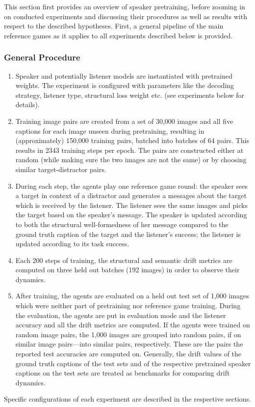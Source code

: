 This section first provides an overview of speaker pretraining, before zooming in on conducted experiments and discussing their procedures as well as results with respect to the described hypotheses.
First, a general pipeline of the main reference games as it applies to all experiments described below is provided.

\subsubsection{General Procedure}
\begin{enumerate}
	\item Speaker and potentially listener models are instantiated with pretrained weights. The experiment is configured with parameters like the decoding strategy, listener type, structural loss weight etc. (see experiments below for details).   
	\item Training image pairs are created from a set of 30,000 images and all five captions for each image unseen during pretraining, resulting in (approximately) 150,000 training pairs, batched into batches of 64 pairs. This results in 2343 training steps per epoch. The pairs are constructed either at random (while making sure the two images are not the same) or by choosing similar target-distractor pairs. 
	\item During each step, the agents play one reference game round: the speaker sees a target in context of a distractor and generates a messages about the target which is received by the listener. The listener sees the same images and picks the target based on the speaker's message. The speaker is updated according to both the structural well-formedness of her message compared to the ground truth caption of the target and the listener's success; the listener is updated according to its task success. 
	\item Each 200 steps of training, the structural and semantic drift metrics are computed on three held out batches (192 images) in order to observe their dynamics.
	\item After training, the agents are evaluated on a held out test set of 1,000 images which were neither part of pretraining nor reference game training. During the evaluation, the agents are put in evaluation mode and the listener accuracy and all the drift metrics are computed. If the agents were trained on random image pairs, the 1,000 images are grouped into random pairs, if on similar image pairs---into similar pairs, respectively. These are the pairs the reported test accuracies are computed on. Generally, the drift values of the ground truth captions of the test sets and of the respective pretrained speaker captions on the test sets are treated as benchmarks for comparing drift dynamics.
\end{enumerate}
Specific configurations of each experiment are described in the respective sections. 


